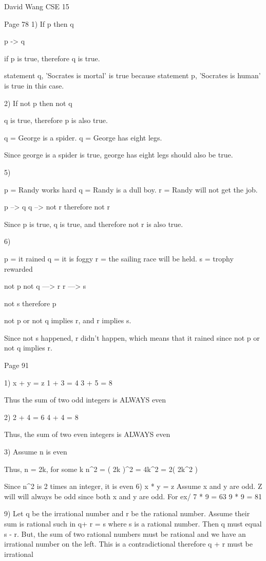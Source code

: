 David Wang
CSE 15

Page 78 
1)
	If p then q

	p -> q 

	if p is true, therefore q is true.

	statement q, 'Socrates is mortal'  is true because statement p, 'Socrates is human' is true in this case.

2)
	If not p then not q

	q is true, therefore p is also true.

	q = George is a spider.
	q = George has eight legs.

	Since george is a spider is true, george has eight legs should also be true.

5)


	p = Randy works hard
	q = Randy is a dull boy.
	r = Randy will not get the job.


	p --> q
	q --> not r
	therefore not r

	Since p is true, q is true, and therefore not r is also true.


6)

	p = it rained
	q = it is foggy
	r = the sailing race will be held.
	s = trophy rewarded

	not p \/ not q ---> r 
	r ---> s

	not s
	therefore p

	not p or not q implies r, and r implies s. 

	Since not s happened, r didn't happen, which means that it rained since not p or not q implies r.

Page 91

1) 
	x + y = z
	1 + 3 = 4
	3 + 5 = 8

	Thus the sum of two odd integers is ALWAYS even 

2)
	2 + 4 = 6
	4 + 4 = 8

	Thus, the sum of two even integers is ALWAYS even

3)
	Assume n is even

		Thus, n = 2k, for some k
		n^2 
		= ( 2k )^2 
		= 4k^2 
		= 2( 2k^2 )

	Since  n^2 is 2 times an integer, it is even
6)
	x * y = z 
	Assume x and y are odd.
	Z will will always be odd since both x and y are odd. For ex/ 7 * 9 = 63   9 * 9 = 81 

9)
	Let  q be the irrational number and r be the rational number. Assume their sum is rational such in  q+ r = s
	where s is a rational number. Then q must equal s - r. But, the sum of two rational numbers must be rational 
	and we have an irrational number on the left. This is a contradictional therefore  q + r must be irrational	
	
